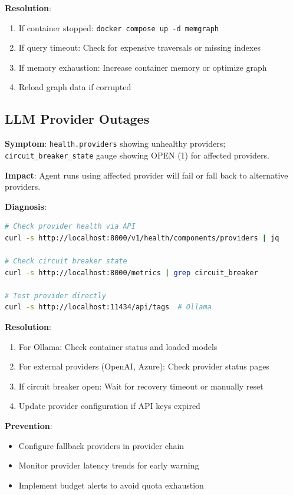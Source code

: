 \textbf{Resolution}:
\begin{enumerate}
    \item If container stopped: \texttt{docker compose up -d memgraph}
    \item If query timeout: Check for expensive traversals or missing indexes
    \item If memory exhaustion: Increase container memory or optimize graph
    \item Reload graph data if corrupted
\end{enumerate}

\subsection{LLM Provider Outages}

\textbf{Symptom}: \texttt{health.providers} showing unhealthy providers; \texttt{circuit\_breaker\_state} gauge showing OPEN (1) for affected providers.

\textbf{Impact}: Agent runs using affected provider will fail or fall back to alternative providers.

\textbf{Diagnosis}:
\begin{lstlisting}[language=bash, caption={Provider health diagnostic commands}]
# Check provider health via API
curl -s http://localhost:8000/v1/health/components/providers | jq

# Check circuit breaker state
curl -s http://localhost:8000/metrics | grep circuit_breaker

# Test provider directly
curl -s http://localhost:11434/api/tags  # Ollama
\end{lstlisting}

\textbf{Resolution}:
\begin{enumerate}
    \item For Ollama: Check container status and loaded models
    \item For external providers (OpenAI, Azure): Check provider status pages
    \item If circuit breaker open: Wait for recovery timeout or manually reset
    \item Update provider configuration if API keys expired
\end{enumerate}

\textbf{Prevention}:
\begin{itemize}
    \item Configure fallback providers in provider chain
    \item Monitor provider latency trends for early warning
    \item Implement budget alerts to avoid quota exhaustion
\end{itemize}

